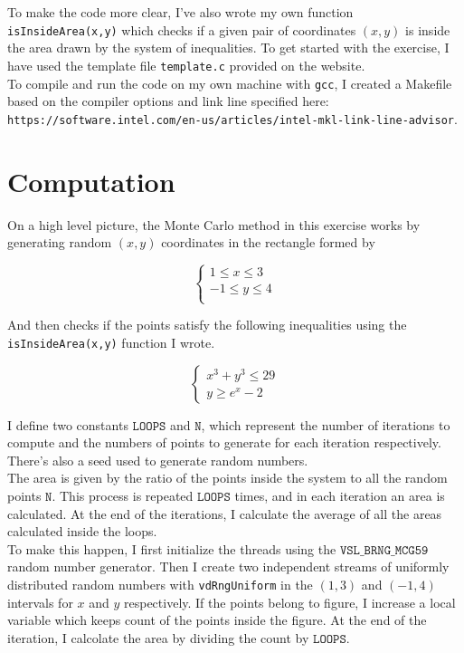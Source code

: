 \documentclass{article}
\newcommand{\code}{\texttt}
\begin{document}
To make the code more clear, I've also wrote my own function \code{isInsideArea(x,y)} which checks if a given pair of coordinates $(x, y)$ is inside the area drawn by the system of inequalities. To get started with the exercise, I have used the template file \code{template.c} provided on the website.\\

To compile and run the code on my own machine with \code{gcc}, I created a Makefile based on the compiler options and link line specified here:\\ \code{https://software.intel.com/en-us/articles/intel-mkl-link-line-advisor}.

\section{Computation}
On a high level picture, the Monte Carlo method in this exercise works by generating random $(x,y)$ coordinates in the rectangle formed by

$$
\begin{cases}
1 \le x \le 3 \\
-1\le y \le 4 \\  
\end{cases}$$

And then checks if the points satisfy the following inequalities using the \code{isInsideArea(x,y)} function I wrote.

$$
\begin{cases}
x^3+y^3\le 29 \\
y \ge e^x -2
\end{cases}$$

I define two constants $\code{LOOPS}$ and $\code{N}$, which represent the number of iterations to compute and the numbers of points to generate for each iteration respectively. There's also a seed used to generate random numbers.\\

The area is given by the ratio of the points inside the system to all the random points $\code{N}$. This process is repeated $\code{LOOPS}$ times, and in each iteration an area is calculated. At the end of the iterations, I calculate the average of all the areas calculated inside the loops.\\

To make this happen, I first initialize the threads using the $\code{VSL\_BRNG\_MCG59}$ random number generator. Then I create two independent streams of uniformly distributed random numbers with \code{vdRngUniform} in the $(1,3)$ and $(-1,4)$ intervals for $x$ and $y$ respectively. If the points belong to figure, I increase a local variable which keeps count of the points inside the figure. At the end of the iteration, I calcolate the area by dividing the count by $\code{LOOPS}$.\\
\end{document}
